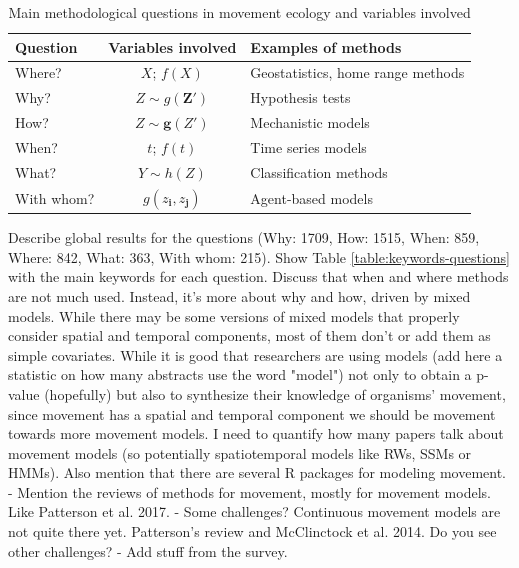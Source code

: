 \documentclass[9pt,twocolumn,twoside,lineno]{pnas-new}
\begin{document}
\begin{table}%
\centering
\caption{Main methodological questions in movement ecology and variables involved}
\begin{tabular}{lcl}
Question   & Variables involved                  & Examples of methods                              \\
\midrule
Where?     & $X$; $f(X)$                         & Geostatistics, home range methods \\
Why?       & $Z \sim g(\mathbf{Z'})$             & Hypothesis tests                                 \\
How?       & $Z \sim \mathbf{g}(Z')$             & Mechanistic models                               \\
When?      & $t$; $f(t)$                         & Time series models                               \\
What?      & $Y \sim h(Z)$                       & Classification methods                           \\
With whom? & $g(z_{\mathbf{i}}, z_{\mathbf{j}})$ & Agent-based models       \\
 \bottomrule
\end{tabular}
\label{table:methods}
\end{table}

Describe global results for the questions (Why: 1709, How: 	1515, When: 859, Where:	842, What: 363, With whom: 215). Show Table \ref{table:keywords-questions} with the main keywords for each question. Discuss that when and where methods are not much used. Instead, it's more about why and how, driven by mixed models. While there may be some versions of mixed models that properly consider spatial and temporal components, most of them don't or add them as simple covariates.  While it is good that researchers are using models (add here a statistic on how many abstracts use the word "model") not only to obtain a p-value (hopefully) but also to synthesize their knowledge of organisms' movement, since movement has a spatial and temporal component we should be movement towards more movement models.  I need to quantify how many papers talk about movement models (so potentially spatiotemporal models like RWs, SSMs or HMMs). Also mention that there are several R packages for modeling movement. 
- Mention the reviews of methods for movement, mostly for movement models. Like Patterson et al. 2017.
- Some challenges? Continuous movement models are not quite there yet. Patterson's review and McClinctock et al. 2014. Do you see other challenges? 
- Add stuff from the survey.
\end{document}
